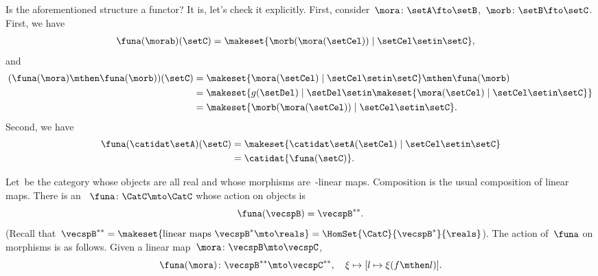 \begin{example}
    Is the aforementioned structure a functor?
    It is, let's check it explicitly.
    First, consider~$\mora\colon \setA\fto \setB$,~$\morb\colon \setB \fto \setC$.
    First, we have
    \begin{equation}
        \begin{aligned}
            \funa(\morab)(\setC) & =\makeset{ \morb(\mora(\setCel))\mid \setCel \setin \setC},
        \end{aligned}
    \end{equation}
    and
    \begin{equation}
        \begin{aligned}
            (\funa(\mora)\mthen \funa(\morb))(\setC)
             & =\makeset{ \mora(\setCel) \mid \setCel \setin \setC}\mthen \funa(\morb) \\
             & =\makeset{g(\setDel)\mid \setDel \setin \makeset{\mora(\setCel)\mid \setCel\setin \setC}} \\
             & =\makeset{ \morb(\mora(\setCel))\mid \setCel \setin \setC}.
        \end{aligned}
    \end{equation}
    Second, we have
    \begin{equation}
        \begin{aligned}
            \funa(\catidat\setA)(\setC) & = \makeset{\catidat\setA(\setCel)\mid \setCel \setin \setC} \\
                                        & =\catidat{\funa(\setC)}.
        \end{aligned}
    \end{equation}
\end{example}

\begin{example}
    \label{exa:double-dual-functor}
    Let~\CatC be the category whose objects are all real  and whose morphisms are~\reals-linear maps.
    Composition is the usual composition of linear maps.
    There is an ~$\funa \colon \CatC \mto \CatC$ whose action on objects is
    \begin{equation}
        \funa ( \vecspB ) = \vecspB^{**}.
    \end{equation}
    (Recall that~$\vecspB^{**} = \makeset{ \text{linear maps } \vecspB^* \mto \reals } =  \HomSet{\CatC}{\vecspB^*}{\reals}$).
    The action of~$\funa$ on morphisms is as follows.
    Given a linear map~$\mora \colon \vecspB \mto \vecspC$,
    \begin{equation}
        \funa ( \mora ) \colon \vecspB^{**} \mto \vecspC^{**}, \quad \xi \mapsto [ l \mapsto \xi (f \mthen l)].
    \end{equation}
\end{example}

